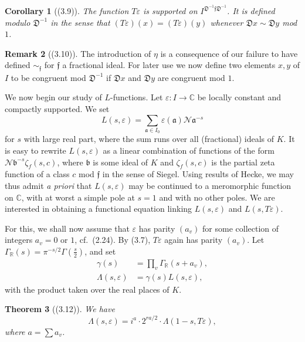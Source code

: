 \documentclass[12pt,a4paper]{article}
\theoremstyle{plain}
\newtheorem{theorem}{Theorem}[section]
\newtheorem{corollary}[theorem]{Corollary}
\theoremstyle{definition}
\newtheorem{remark0}[theorem]{Remark}
\newcommand{\DD}{\mathfrak{D}}
\newcommand{\ff}{\mathfrak{f}}
\newcommand{\R}{\mathbb{R}}
\newcommand{\C}{\mathbb{C}}
\begin{document}
\begin{corollary}[(3.9)]\label{cor:support}
The function $T\varepsilon$ is supported on $I^{\DD^{-1}\ff\DD^{-1}}$. It is defined modulo $\DD^{-1}$ in the sense that $(T\varepsilon)(x)=(T\varepsilon)(y)$ whenever $\DD x\sim\DD y$ mod $1$.
\end{corollary}

\begin{remark0}[(3.10)]\label{rem:modD}
The introduction of $\eta$ is a consequence of our failure to have defined $\sim_{\ff}$ for $\ff$ a fractional ideal. For later use we now define two elements $x,y$ of $I$ to be congruent mod $\DD^{-1}$ if $\DD x$ and $\DD y$ are congruent mod $1$.
\end{remark0}

We now begin our study of $L$-functions. Let $\varepsilon:I\to\C$ be locally constant and compactly supported. We set
\[
L(s,\varepsilon)=\sum_{\mathfrak{a}\in I_0}\varepsilon(\mathfrak{a})\mathcal{N}\mathfrak{a}^{-s}
\]
for $s$ with large real part, where the sum runs over all (fractional) ideals of $K$. It is easy to rewrite $L(s,\varepsilon)$ as a linear combination of functions of the form $\mathcal{N}\mathfrak{b}^{-s}\zeta_f(s,c)$, where $\mathfrak{b}$ is some ideal of $K$ and $\zeta_f(s,c)$ is the partial zeta function of a class $c$ mod $\ff$ in the sense of Siegel. Using results of Hecke, we may thus admit \textit{a priori} that $L(s,\varepsilon)$ may be continued to a meromorphic function on $\C$, with at worst a simple pole at $s=1$ and with no other poles. We are interested in obtaining a functional equation linking $L(s,\varepsilon)$ and $L(s,T\varepsilon)$.

For this, we shall now assume that $\varepsilon$ has parity $(a_v)$ for some collection of integers $a_v=0$ or $1$, cf.~(2.24). By (3.7), $T\varepsilon$ again has parity $(a_v)$. Let $\Gamma_{\R}(s)=\pi^{-s/2}\Gamma(\frac{s}{2})$, and set
\begin{align}
\gamma(s)&=\prod_v\Gamma_{\R}(s+a_v),\label{eq:gamma}\\
\Lambda(s,\varepsilon)&=\gamma(s)L(s,\varepsilon),\label{eq:Lambda}
\end{align}
with the product taken over the real places of $K$.

\begin{theorem}[(3.12)]\label{thm:functional}
We have
\[
\Lambda(s,\varepsilon)=i^{a}\cdot2^{ra/2}\cdot\Lambda(1-s,T\varepsilon),
\]
where $a=\sum a_v$.
\end{theorem}
\end{document}
